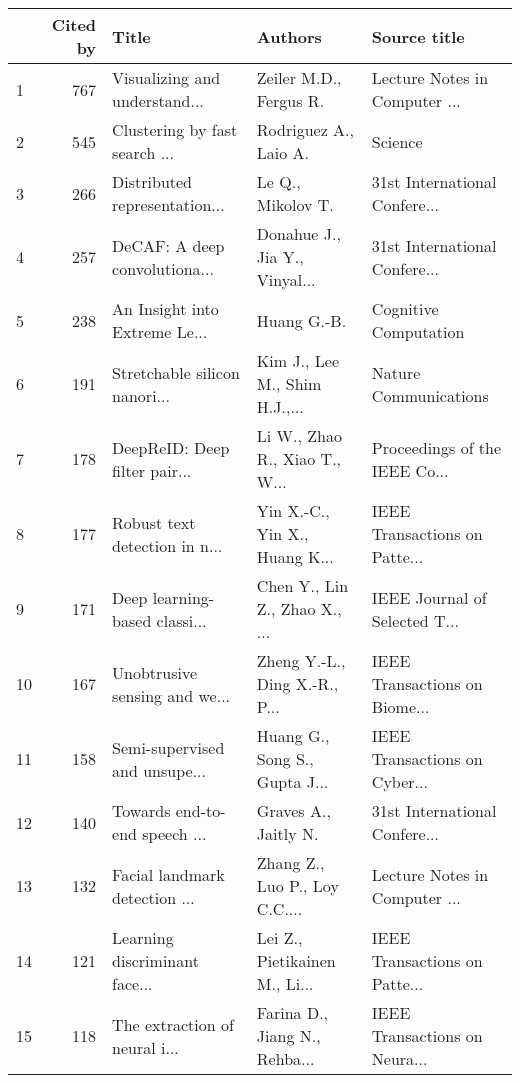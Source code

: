 \begin{tabular}{lrlll}
\toprule
{} &  Cited by &                          Title &                        Authors &                   Source title \\
\midrule
1  &       767 &  Visualizing and understand... &         Zeiler M.D., Fergus R. &  Lecture Notes in Computer ... \\
2  &       545 &  Clustering by fast search ... &          Rodriguez A., Laio A. &                        Science \\
3  &       266 &  Distributed representation... &              Le Q., Mikolov T. &  31st International Confere... \\
4  &       257 &  DeCAF: A deep convolutiona... &  Donahue J., Jia Y., Vinyal... &  31st International Confere... \\
5  &       238 &  An Insight into Extreme Le... &                    Huang G.-B. &          Cognitive Computation \\
6  &       191 &  Stretchable silicon nanori... &  Kim J., Lee M., Shim H.J.,... &          Nature Communications \\
7  &       178 &  DeepReID: Deep filter pair... &  Li W., Zhao R., Xiao T., W... &  Proceedings of the IEEE Co... \\
8  &       177 &  Robust text detection in n... &  Yin X.-C., Yin X., Huang K... &  IEEE Transactions on Patte... \\
9  &       171 &  Deep learning-based classi... &  Chen Y., Lin Z., Zhao X., ... &  IEEE Journal of Selected T... \\
10 &       167 &  Unobtrusive sensing and we... &  Zheng Y.-L., Ding X.-R., P... &  IEEE Transactions on Biome... \\
11 &       158 &  Semi-supervised and unsupe... &  Huang G., Song S., Gupta J... &  IEEE Transactions on Cyber... \\
12 &       140 &  Towards end-to-end speech ... &           Graves A., Jaitly N. &  31st International Confere... \\
13 &       132 &  Facial landmark detection ... &  Zhang Z., Luo P., Loy C.C.... &  Lecture Notes in Computer ... \\
14 &       121 &  Learning discriminant face... &  Lei Z., Pietikainen M., Li... &  IEEE Transactions on Patte... \\
15 &       118 &  The extraction of neural i... &  Farina D., Jiang N., Rehba... &  IEEE Transactions on Neura... \\
\bottomrule
\end{tabular}
